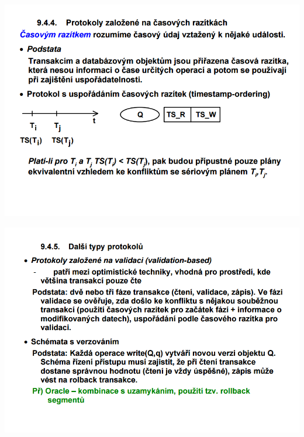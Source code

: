 \documentclass[10pt,a4paper]{article}
\begin{document}
\includegraphics[scale=0.5]{img/84}

\includegraphics[scale=0.5]{img/85}
\end{document}
